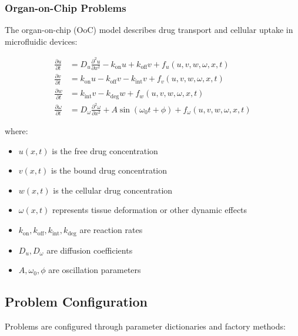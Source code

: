 \subsubsection{Organ-on-Chip Problems}

The organ-on-chip (OoC) model describes drug transport and cellular uptake in microfluidic devices:

\begin{align}
	\frac{\partial u}{\partial t} &= D_u \frac{\partial^2 u}{\partial x^2} - k_{\text{on}} u + k_{\text{off}} v + f_u(u,v,w,\omega,x,t) \label{eq:ooc_u} \\
	\frac{\partial v}{\partial t} &= k_{\text{on}} u - k_{\text{off}} v - k_{\text{int}} v + f_v(u,v,w,\omega,x,t) \label{eq:ooc_v} \\
	\frac{\partial w}{\partial t} &= k_{\text{int}} v - k_{\text{deg}} w + f_w(u,v,w,\omega,x,t) \label{eq:ooc_w} \\
	\frac{\partial \omega}{\partial t} &= D_\omega \frac{\partial^2 \omega}{\partial x^2} + A \sin(\omega_0 t + \phi) + f_\omega(u,v,w,\omega,x,t) \label{eq:ooc_omega}
\end{align}

where:
\begin{itemize}
	\item $u(x,t)$ is the free drug concentration
	\item $v(x,t)$ is the bound drug concentration
	\item $w(x,t)$ is the cellular drug concentration
	\item $\omega(x,t)$ represents tissue deformation or other dynamic effects
	\item $k_{\text{on}}, k_{\text{off}}, k_{\text{int}}, k_{\text{deg}}$ are reaction rates
	\item $D_u, D_\omega$ are diffusion coefficients
	\item $A, \omega_0, \phi$ are oscillation parameters
\end{itemize}

\subsection{Problem Configuration}
\label{subsec:problem_config}

Problems are configured through parameter dictionaries and factory methods:

